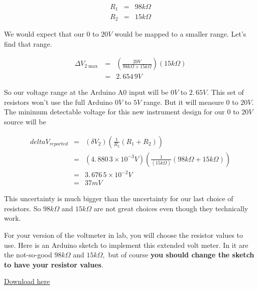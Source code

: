 \begin{eqnarray*}
	R_{1} &=&98\unit{k\Omega} \\
	R_{2} &=&15\unit{k\Omega}
\end{eqnarray*}

We would expect that our $0$ to $20\unit{V}$ would be mapped to a smaller range. Let's find that range.

\begin{eqnarray*}
	\Delta V_{2\max } &=&\left( \frac{20\unit{V}}{98\unit{k\Omega}+15\unit{k\Omega}}\right) \left( 15\unit{k\Omega}\right) \\
                      &=&2.\,\allowbreak 654\,9\unit{V}
\end{eqnarray*}

So our voltage range at the Arduino A0 input will be $0\unit{V}$ to $ 2.\,\allowbreak 65\unit{V}.$ This set of resistors won't use the full Arduino $0\unit{V}$ to $5\unit{V}$ range. But it will measure $0$ to $20 \unit{V}.$ The minimum detectable voltage for this new instrument design for
our $0$ to $20\unit{V}$ source will be 

\begin{eqnarray*}
	delta V_{reported} &=&\left( \delta V_{2}\right) \left( \frac{1}{R_{2}}\left( R_{1}+R_{2}\right) \right) \\
                       &=&\left( 4.\,\allowbreak 880\,3\times 10^{-3}\unit{V}\right) \left( \frac{1}{\left( 15\unit{k\Omega}\right) }\left( 98\unit{k\Omega}+15\unit{k\Omega}\right) \right) \\
                       &=&3.\,\allowbreak 676\,5\times 10^{-2}\unit{V} \\
                       &=&37\unit{mV}
\end{eqnarray*}

This uncertainty is much bigger than the uncertainty for our last choice of resistors. So $98\unit{k\Omega}$ and $15\unit{k\Omega}$ are not great choices even though they technically work.

For your version of the voltmeter in lab, you will choose the resistor values to use. Here is an Arduino sketch to implement this extended volt meter. In it are the not-so-good $98\unit{k\Omega}$ and $15\unit{k\Omega},$ but of course \textbf{you should change the sketch to have your resistor
values}.

\href{https://raw.githubusercontent.com/rtlines/IntermediateLabPH250/main/Code/DAQ_Extended_voltmeter.ino}{Download here}



